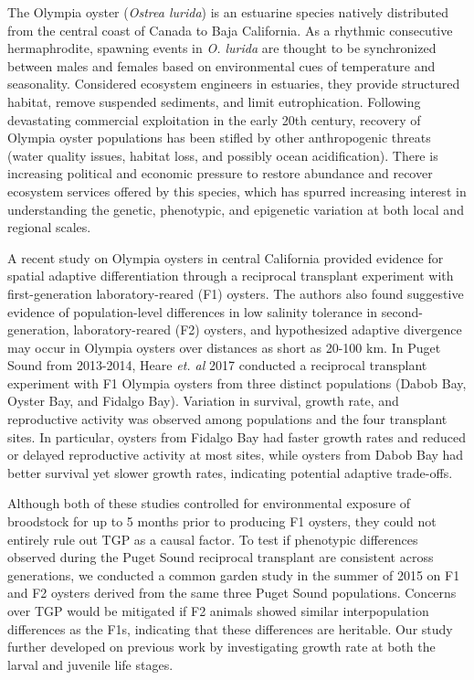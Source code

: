 \documentclass[10pt,letterpaper]{article}
\begin{document}
The Olympia oyster (\textit{Ostrea lurida}) is an estuarine species natively distributed from the central coast of Canada to Baja California. As a rhythmic consecutive hermaphrodite, spawning events in \textit{O. lurida} are thought to be synchronized between males and females based on environmental cues of temperature and seasonality\cite{Coe1932-nq}. Considered ecosystem engineers in estuaries, they provide structured habitat, remove suspended sediments, and limit eutrophication\cite{Ruesink2005-lt}. Following devastating commercial exploitation in the early 20th century, recovery of Olympia oyster populations has been stifled by other anthropogenic threats (water quality issues, habitat loss, and possibly ocean acidification)\cite{Blake2012-ln,Hettinger2013-od}. There is increasing political and economic pressure to restore abundance and recover ecosystem services offered by this species, which has spurred increasing interest in understanding the genetic, phenotypic, and epigenetic variation at both local and regional scales\cite{Camara2009-sn}.\par 
A recent study on Olympia oysters in central California provided evidence for spatial adaptive differentiation through a reciprocal transplant experiment with first-generation laboratory-reared (F1) oysters. The authors also found suggestive evidence of population-level differences in low salinity tolerance in second-generation, laboratory-reared (F2) oysters, and hypothesized adaptive divergence may occur in Olympia oysters over distances as short as 20-100 km\cite{Bible2016-rb}. In Puget Sound from 2013-2014, Heare \textit{et. al} 2017\cite{Heare2017-uv} conducted a reciprocal transplant experiment with F1 Olympia oysters from three distinct populations (Dabob Bay, Oyster Bay, and Fidalgo Bay). Variation in survival, growth rate, and reproductive activity was observed among populations and the four transplant sites. In particular, oysters from Fidalgo Bay had faster growth rates and reduced or delayed reproductive activity at most sites, while oysters from Dabob Bay had better survival yet slower growth rates, indicating potential adaptive trade-offs\cite{Heare2017-uv}.\par 
Although both of these studies controlled for environmental exposure of broodstock for up to 5 months prior to producing F1 oysters, they could not entirely rule out TGP as a causal factor. To test if phenotypic differences observed during the Puget Sound reciprocal transplant are consistent across generations, we conducted a common garden study in the summer of 2015 on F1 and F2 oysters derived from the same three Puget Sound populations. Concerns over TGP would be mitigated if F2 animals showed similar interpopulation differences as the F1s, indicating that these differences are heritable. Our study further developed on previous work by investigating growth rate at both the larval and juvenile life stages. 
\end{document}
